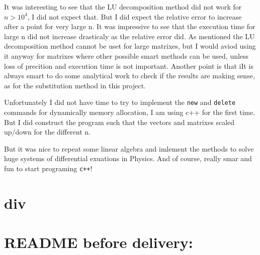 \documentclass[11pt,a4wide]{article}
\begin{document}
It was interesting to see that the LU decomposition method did not work for $n>10^4$, I did not expect that. But I did expect the relative error to increase after a point for very large n. It was impressive to see that the execution time for large n did not increase drasticaly as the relative error did. As mentioned the LU decomposition method cannot be uset for large matrixes, but I would aviod using it anyway for matrixes where other possible smart methods can be used, unless loss of precition and execution time is not important. Another point is that iIt is always smart to do some analytical work to check if the results are making sense, as for the substitution method in this project. 

Unfortunately I did not have time to try to implement the \texttt{new} and \texttt{delete} commands for dynamically memory allocation, I am using c++ for the first time. But I did construct the program such that the vectors and matrixes scaled up/down for the different n. 

But it was nice to repeat some linear algebra and imlement the methods to solve huge systems of differential exuations in Physics. And of course, really smar and fun to start programing \texttt{c++}!

\section{div}








\newpage
\section*{ README before delivery:}
\end{document}
